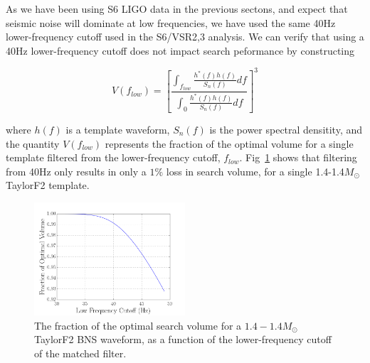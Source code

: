 As we have been using S6 LIGO data in the previous sectons, and expect that seismic noise will dominate at low frequencies, we have used the same 40Hz lower-frequency cutoff used in the S6/VSR2,3 analysis. We can verify that using a 40Hz lower-frequency cutoff does not impact search peformance by constructing

\begin{equation}
V(f_{low}) = \left[ \frac{\int_{f_{low}} \frac{h^{*}(f)h(f)}{S_n(f)} df}{\int_{0} \frac{h^*(f)h(f)}{S_n(f)} df} \right]^3
\end{equation}

where $h(f)$ is a template waveform, $S_n(f)$ is the power spectral densitity, and the quantity $V(f_{low})$ represents the fraction of the optimal volume for a single template
filtered from the lower-frequency cutoff, $f_{low}$. Fig~\ref{fig:flow} shows that filtering from 40Hz only results in only a $1\%$ loss in search volume, for a single 1.4-1.4$M_\odot$ TaylorF2 template. 




\begin{figure}
\includegraphics[width=0.5\textwidth]{papers/bns_o1_dev/figures/flow.png}
\caption{\label{fig:flow} 
The fraction of the optimal search volume for a $1.4-1.4 M_\odot$ TaylorF2 BNS waveform, as a function of the lower-frequency cutoff of the matched filter. 
}
\end{figure}

